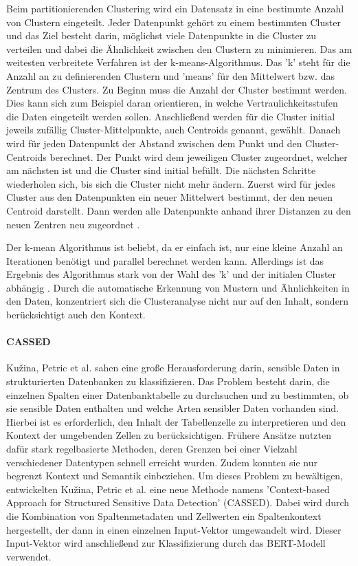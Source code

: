 Beim partitionierenden Clustering wird ein Datensatz in eine bestimmte Anzahl von Clustern eingeteilt. Jeder Datenpunkt gehört zu einem bestimmten Cluster und das Ziel besteht darin, möglichst viele Datenpunkte in die Cluster zu verteilen und dabei die Ähnlichkeit zwischen den Clustern zu minimieren. Das am weitesten verbreitete Verfahren ist der k-means-Algorithmus. Das 'k' steht für die Anzahl an zu definierenden Clustern und 'means' für den Mittelwert bzw. das Zentrum des Clusters. Zu Beginn muss die Anzahl der Cluster bestimmt werden. Dies kann sich zum Beispiel daran orientieren, in welche Vertraulichkeitsstufen die Daten eingeteilt werden sollen. Anschließend werden für die Cluster initial jeweils zufällig Cluster-Mittelpunkte, auch Centroids genannt, gewählt. Danach wird für jeden Datenpunkt der Abstand zwischen dem Punkt und den Cluster-Centroids berechnet. Der Punkt wird dem jeweiligen Cluster zugeordnet, welcher am nächsten ist und die Cluster sind initial befüllt. Die nächsten Schritte wiederholen sich, bis sich die Cluster nicht mehr ändern. Zuerst wird für jedes Cluster aus den Datenpunkten ein neuer Mittelwert bestimmt, der den neuen Centroid darstellt. Dann werden alle Datenpunkte anhand ihrer Distanzen zu den neuen Zentren neu zugeordnet \cite{Suyal.2014}.

Der k-mean Algorithmus ist beliebt, da er einfach ist, nur eine kleine Anzahl an Iterationen benötigt und parallel berechnet werden kann. Allerdings ist das Ergebnis des Algorithmus stark von der Wahl des 'k' und der initialen Cluster abhängig \cite{Suyal.2014}.
Durch die automatische Erkennung von Mustern und Ähnlichkeiten in den Daten, konzentriert sich die Clusteranalyse nicht nur auf den Inhalt, sondern berücksichtigt auch den Kontext.

\paragraph{CASSED}
Kužina, Petric et al. \cite{Kuzina.2023} sahen eine große Herausforderung darin, sensible Daten in strukturierten Datenbanken zu klassifizieren. Das Problem besteht darin, die einzelnen Spalten einer Datenbanktabelle zu durchsuchen und zu bestimmten, ob sie sensible Daten enthalten und welche Arten sensibler Daten vorhanden sind. Hierbei ist es erforderlich, den Inhalt der Tabellenzelle zu interpretieren und den Kontext der umgebenden Zellen zu berücksichtigen. Frühere Ansätze nutzten dafür stark regelbasierte Methoden, deren Grenzen bei einer Vielzahl verschiedener Datentypen schnell erreicht wurden. Zudem konnten sie nur begrenzt Kontext und Semantik einbeziehen. Um dieses Problem zu bewältigen, entwickelten
Kužina, Petric et al. \cite{Kuzina.2023} eine neue Methode namens 'Context-based Approach for Structured Sensitive Data Detection' (CASSED). Dabei wird durch die Kombination von Spaltenmetadaten und Zellwerten ein Spaltenkontext hergestellt, der dann in einen einzelnen Input-Vektor umgewandelt wird. Dieser Input-Vektor wird anschließend zur Klassifizierung durch das BERT-Modell verwendet.

